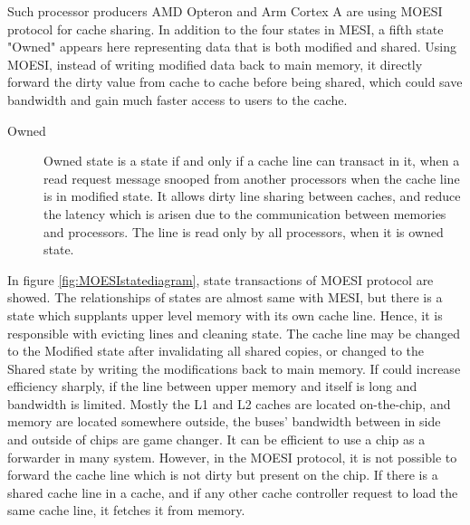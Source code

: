         Such processor producers AMD Opteron and Arm Cortex A are using MOESI protocol for cache sharing. In addition to the four states in MESI, a fifth state "Owned" appears here representing data that is both modified and shared. Using MOESI, instead of writing modified data back to main memory, it directly forward the dirty value from cache to cache before being shared, which could save bandwidth and gain much faster access to users to the cache.

        \begin{description}
            \item[Owned] Owned state is a state if and only if a cache line can transact in it, when a read request message snooped from another processors when the cache line is in modified state. It allows dirty line sharing between caches, and reduce the latency which is arisen due to the communication between memories and processors. The line is read only by all processors, when it is owned state.
        \end{description}

        In figure \ref{fig:MOESIstatediagram}, state transactions of MOESI protocol are showed. The relationships of states are almost same with MESI, but there is a state which supplants upper level memory with its own cache line. Hence, it is responsible with evicting lines and cleaning state. The cache line may be changed to the Modified state after invalidating all shared copies, or changed to the Shared state by writing the modifications back to main memory. If could increase efficiency sharply, if the line between upper memory and itself is long and bandwidth is limited. Mostly the L1 and L2 caches are located on-the-chip, and memory are located somewhere outside, the buses' bandwidth between in side and outside of chips are game changer. It can be efficient to use a chip as a forwarder in many system. However, in the MOESI protocol, it is not possible to forward the cache line which is not dirty but present on the chip. If there is a shared cache line in a cache, and if any other cache controller request to load the same cache line, it fetches it from memory.


